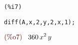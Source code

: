\documentclass{article}
\begin{document}
\noindent
\begin{minipage}[t]{8ex}{\color{red}\bf
\begin{verbatim}
(%i7) 
\end{verbatim}}
\end{minipage}
\begin{minipage}[t]{\textwidth}{\color{blue}
\begin{verbatim}
diff(A,x,2,y,2,x,1);
\end{verbatim}}
\end{minipage}
\begin{math}\displaystyle
\parbox{8ex}{\color{labelcolor}(\%o7) }
360\,{x}^{2}\,y
\end{math}
\end{document}
